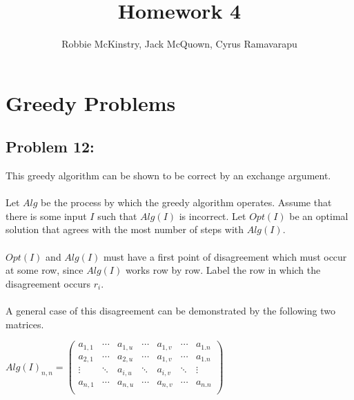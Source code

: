 \documentclass[12pt]{article}
\begin{document}
\title{Homework 4}
\author{Robbie McKinstry, Jack McQuown, Cyrus Ramavarapu}
\renewcommand{\today}{9 September 2016}
\renewcommand{\baselinestretch}{1.5}

\maketitle

\section*{Greedy Problems}
\subsection*{Problem 12:}
This greedy algorithm can be shown to be correct by an exchange argument.\\\\
Let $Alg$ be the process by which the greedy algorithm operates.  Assume that
there is some input $I$ such that $Alg(I)$ is incorrect. Let $Opt(I)$ be an
optimal solution that agrees with the most number of steps with $Alg(I)$.\\\\
$Opt(I)$ and $Alg(I)$ must have a first point of disagreement which must occur
at some row, since $Alg(I)$ works row by row.  Label the row in which the
disagreement occurs $r_i$.\\\\
A general case of this disagreement can be demonstrated by the following two
matrices.
\begin{center}
$
Alg(I)_{n,n} = 
    \begin{pmatrix}
    a_{1,1} & \cdots & a_{1,u} & \cdots & a_{1,v} & \cdots & a_{1.n} \\
    a_{2,1} & \cdots & a_{2,u} & \cdots & a_{1,v} & \cdots & a_{1.n} \\
    \vdots  & \ddots & a_{i,u} & \ddots & a_{i,v} & \ddots & \vdots \\ 
    a_{n,1} & \cdots & a_{n,u} & \cdots & a_{n,v} & \cdots & a_{n.n} \\
    \end{pmatrix}
$ 
\end{center}
\end{document}
